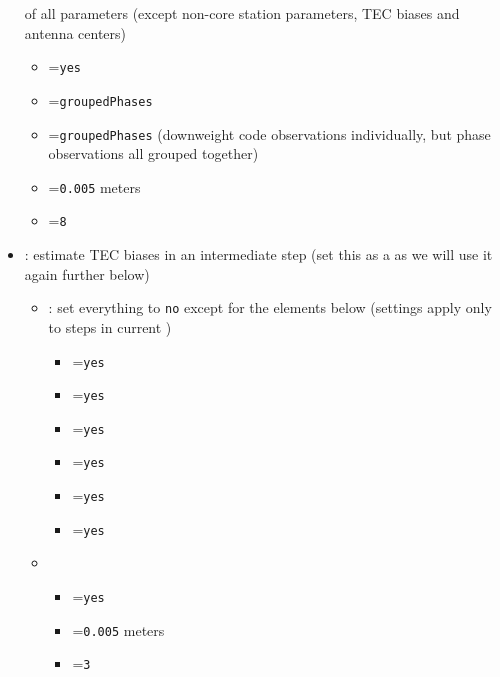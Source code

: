 \begin{itemize}
        of all parameters (except non-core station parameters, TEC biases and antenna centers)
  \begin{itemize}
    \item {}=\verb|yes|
    \item {}=\verb|groupedPhases|
    \item {}=\verb|groupedPhases| (downweight code observations individually,
          but phase observations all grouped together)
    \item {}=\verb|0.005| meters
    \item {}=\verb|8|
  \end{itemize}
  \item {}: estimate TEC biases in an intermediate
        step (set this as a  as we will use it
        again further below)
  \begin{itemize}
    \item {}: set everything
          to \verb|no| except for the elements below (settings apply only to steps in current
          )
    \begin{itemize}
      \item {}=\verb|yes|
      \item {}=\verb|yes|
      \item {}=\verb|yes|
      \item {}=\verb|yes|
      \item {}=\verb|yes|
      \item {}=\verb|yes|
    \end{itemize}
    \item {}
    \begin{itemize}
      \item {}=\verb|yes|
      \item {}=\verb|0.005| meters
      \item {}=\verb|3|
    \end{itemize}

\end{itemize}
\end{itemize}
